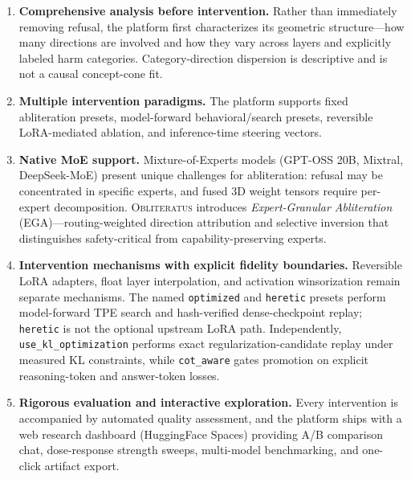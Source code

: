 \documentclass[11pt]{article}
\begin{document}
\begin{enumerate}[leftmargin=*]
    \item \textbf{Comprehensive analysis before intervention.} Rather than immediately removing refusal, the platform first characterizes its geometric structure---how many directions are involved and how they vary across layers and explicitly labeled harm categories. Category-direction dispersion is descriptive and is not a causal concept-cone fit.
    \item \textbf{Multiple intervention paradigms.} The platform supports fixed abliteration presets, model-forward behavioral/search presets, reversible LoRA-mediated ablation, and inference-time steering vectors.
    \item \textbf{Native MoE support.} Mixture-of-Experts models (GPT-OSS 20B, Mixtral, DeepSeek-MoE) present unique challenges for abliteration: refusal may be concentrated in specific experts, and fused 3D weight tensors require per-expert decomposition. \textsc{Obliteratus} introduces \emph{Expert-Granular Abliteration} (EGA)---routing-weighted direction attribution and selective inversion that distinguishes safety-critical from capability-preserving experts.
    \item \textbf{Intervention mechanisms with explicit fidelity boundaries.} Reversible LoRA adapters, float layer interpolation, and activation winsorization remain separate mechanisms. The named \texttt{optimized} and \texttt{heretic} presets perform model-forward TPE search and hash-verified dense-checkpoint replay; \texttt{heretic} is not the optional upstream LoRA path. Independently, \texttt{use\_kl\_optimization} performs exact regularization-candidate replay under measured KL constraints, while \texttt{cot\_aware} gates promotion on explicit reasoning-token and answer-token losses.
    \item \textbf{Rigorous evaluation and interactive exploration.} Every intervention is accompanied by automated quality assessment, and the platform ships with a web research dashboard (HuggingFace Spaces) providing A/B comparison chat, dose-response strength sweeps, multi-model benchmarking, and one-click artifact export.
\end{enumerate}
\end{document}
